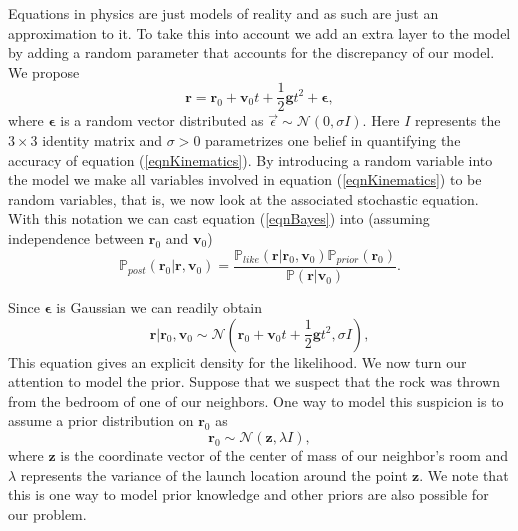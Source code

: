 \documentclass[12pt]{book}
\newcommand{\post}{\mathbb{P}_{post}}
\newcommand{\like}{\mathbb{P}_{like}}
\newcommand{\prior}{\mathbb{P}_{prior}}
\newcommand{\p}{\mathbb{P}}
\begin{document}
Equations in physics are just models of reality and as such are just an approximation to it. To take
this into account we add an extra layer to the model by adding a random parameter that accounts
for the discrepancy of our model. We propose 
\begin{equation*}
\textbf{r}=\textbf{r}_{0}+\textbf{v}_{0}t+\frac{1}{2}\textbf{g}t^{2}+\mathbf{\epsilon},
\end{equation*} 
where $\mathbf{\epsilon}$ is a random vector distributed as $\vec{\epsilon}\sim\mathscr{N}(0,\sigma I)$. Here $I$
represents the $3\times 3$ identity matrix and $\sigma>0$ parametrizes one belief in quantifying the 
accuracy  
of equation (\ref{eqnKinematics}).  By introducing a random variable into the model
we make all variables involved  in equation (\ref{eqnKinematics})
to be  random variables, that is, we now look at the  associated stochastic equation. With this notation
we can cast equation (\ref{eqnBayes}) into  (assuming independence between $\textbf{r}_{0}$ and $\textbf{v}_{0}$)
\begin{equation}\label{eqnpostrock}
\post(\textbf{r}_{0}|\textbf{r},\textbf{v}_{0})=\frac{\like(\textbf{r}|\textbf{r}_{0},\textbf{v}_{0})
\prior(\textbf{r}_{0})}{\p(\textbf{r}|\textbf{v}_{0})}.
\end{equation}



Since $\mathbf{\epsilon}$ is Gaussian we can readily obtain \cite{Somersalo}
\begin{equation*}
\textbf{r}|\textbf{r}_{0},\textbf{v}_{0}\sim \mathscr{N}(\textbf{r}_{0}+\textbf{v}_{0}t+\frac{1}{2}\textbf{g}t^{2}
,\sigma I),
\end{equation*}
This equation gives an explicit density for the likelihood. We now turn our attention to model the prior.
Suppose that we suspect that the rock was thrown from the bedroom of one of our neighbors.
 One way to model this suspicion is to assume a prior distribution on $\textbf{r}_{0}$ as
\begin{equation*}
\textbf{r}_{0}\sim\mathscr{N}(\textbf{z},\lambda I),
\end{equation*}
where $\textbf{z}$ is the coordinate vector of the center of mass of our neighbor's room and $\lambda$ represents 
the variance of the launch location around the point $\textbf{z}$. We note that  this is one way to model 
 prior knowledge and other priors are also possible for our problem.
\end{document}
